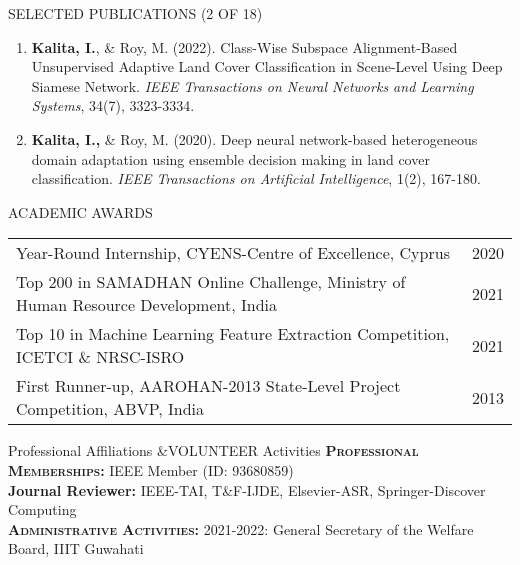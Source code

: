 \documentclass{resume} %
\begin{document}
\begin{rSection}{SELECTED PUBLICATIONS (2 OF 18)}
\vspace{-4px}
\begin{enumerate}
 \item \textbf{Kalita, I.}, \& Roy, M. (2022). Class-Wise Subspace Alignment-Based Unsupervised Adaptive Land Cover Classification in Scene-Level Using Deep Siamese Network. \textit{IEEE Transactions on Neural Networks and Learning Systems}, 34(7), 3323-3334.
 \vspace{-8px}
\item \textbf{Kalita, I.,} \& Roy, M. (2020). Deep neural network-based heterogeneous domain adaptation using ensemble decision making in land cover classification. \textit{IEEE Transactions on Artificial Intelligence}, 1(2), 167-180.
\end{enumerate}
\end{rSection}
\vspace{-5px}	
\begin{rSection}{ACADEMIC AWARDS}
		\vspace{-4px}
	\begin{tabular}{p{16cm}r}
		Year-Round Internship, CYENS-Centre of Excellence, Cyprus & 2020 \\
		Top 200 in SAMADHAN Online Challenge, Ministry of Human Resource Development, India & 2021 \\
		Top 10 in Machine Learning Feature Extraction Competition, ICETCI \& NRSC-ISRO & 2021 \\
		First Runner-up, AAROHAN-2013 State-Level Project Competition, ABVP, India & 2013 \\
	\end{tabular}
\end{rSection}

\vspace{-5px}
\begin{rSection}{Professional Affiliations \&VOLUNTEER Activities}
		\vspace{-4px}
	\textsc{\textbf{Professional Memberships:}}  IEEE Member (ID: 93680859)\\
	\textbf{Journal Reviewer:} IEEE-TAI, T\&F-IJDE, Elsevier-ASR, Springer-Discover Computing\\
	\textsc{\textbf{Administrative Activities:}} 2021-2022: General Secretary of the Welfare Board, IIIT Guwahati
\end{rSection}
\end{document}
